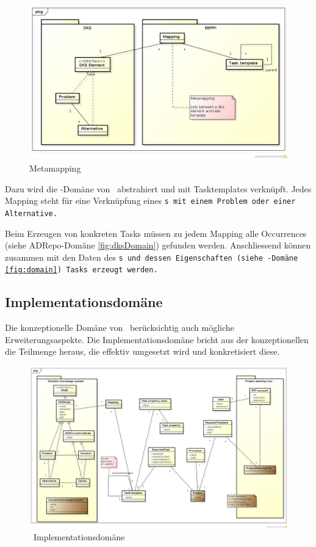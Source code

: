 			\begin{figure}[H]
				\includegraphics[width=\linewidth]{architecture/media/img/metaMapping.png}
				\centering
				\caption{Metamapping}
				\label{fig:metamapping}
			\end{figure}		
			
			Dazu wird die \dks -Domäne von \eeppi\ abstrahiert und mit Task\-tem\-plates verknüpft.
			Jedes Mapping steht für eine Verknüpfung eines \tt s mit einem Problem oder einer Alternative.
			
			Beim Erzeugen von konkreten Tasks müssen zu jedem Mapping alle Occurrences (siehe ADRepo-Domäne \ref{fig:dksDomain}) gefunden werden. %
			Anschliessend können zusammen mit den Daten des \tt s und dessen Eigenschaften (siehe \eeppi-Domäne \ref{fig:domain}) Tasks erzeugt werden.
			
			
		\subsection{Implementationsdomäne}
			Die konzeptionelle Domäne von \eeppi\ berücksichtig auch mögliche Erweiterungsaspekte.
			Die Implementationsdomäne bricht aus der konzeptionellen die Teilmenge heraus, die effektiv umgesetzt wird und konkretisiert diese.
			
			\begin{landscape}
				\begin{figure}[H]
					\includegraphics[width=0.9\linewidth]{architecture/media/img/implementationDomain.png}
					\centering
					\caption{\eeppi\ Implementationsdomäne}
					\label{fig:implementationDomain}
				\end{figure}				
			\end{landscape}	
			
